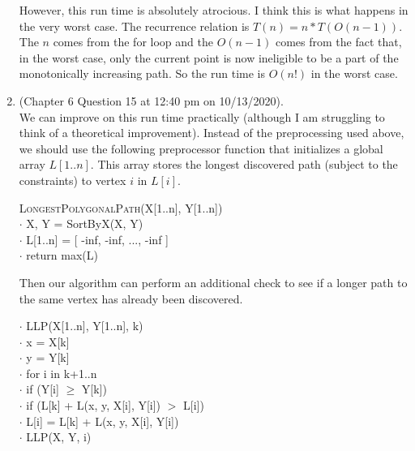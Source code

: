 \documentclass{article}
\begin{document}
\begin{enumerate}
        However, this run time is absolutely atrocious. I think this is what happens in the very worst case. The recurrence relation is $T(n) = n * T(O(n-1))$. The $n$ comes from the for loop and the $O(n-1)$ comes from the fact that, in the worst case, only the current point is now ineligible to be a part of the monotonically increasing path. So the run time is $O(n!)$ in the worst case.
    \item (Chapter 6 Question 15 at 12:40 pm on 10/13/2020). \\
        We can improve on this run time practically (although I am struggling to think of a theoretical improvement).
        Instead of the preprocessing used above, we should use the following preprocessor function that initializes a global array $L[1..n]$.
        This array stores the longest discovered path (subject to the constraints) to vertex $i$ in $L[i]$.

        \begin{algorithm}
        \textsc{LongestPolygonalPath}(X[1..n], Y[1..n]) \\
            $\cdot$ \hspace{1em} X, Y = SortByX(X, Y) \\
            $\cdot$ \hspace{1em} L[1..n] = [ -inf, -inf, ..., -inf ] \\
            $\cdot$ \hspace{1em} return max(L)
        \end{algorithm}

        Then our algorithm can perform an additional check to see if a longer path to the same vertex has already been discovered.

        \begin{algorithm}
            $\cdot$ \hspace{1em} LLP(X[1..n], Y[1..n], k) \\
            $\cdot$ \hspace{1em} x = X[k] \\
            $\cdot$ \hspace{1em} y = Y[k] \\
            $\cdot$ \hspace{1em} for i in k+1..n \\
            $\cdot$ \hspace{2em} if (Y[i] $\geq$ Y[k]) \\
            $\cdot$ \hspace{3em} if (L[k] + L(x, y, X[i], Y[i]) $>$ L[i]) \\
            $\cdot$ \hspace{4em} L[i] = L[k] + L(x, y, X[i], Y[i]) \\
            $\cdot$ \hspace{4em} LLP(X, Y, i)
        \end{algorithm}


\end{enumerate}
\end{document}
